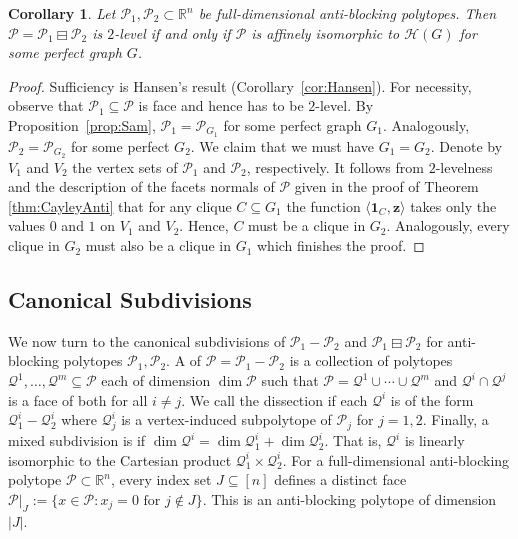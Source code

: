 \documentclass[11pt]{amsart}
\newtheorem{cor}[thm]{Corollary}
\theoremstyle{definition}
\begin{document}
\begin{cor}\label{cor:AB_2l}
    Let ${\mathcal{P}}_1,{\mathcal{P}}_2 \subset {\mathbb{R}}^n$ be full-dimensional anti-blocking
    polytopes.  Then ${\mathcal{P}} = {{{{\mathcal{P}}_1} \boxminus {{\mathcal{P}}_2}}}$ is $2$-level if and only if
    ${\mathcal{P}}$ is affinely isomorphic to ${\mathcal{H}({G})}$ for some perfect graph $G$.
\end{cor}
\begin{proof}
    Sufficiency is Hansen's result (Corollary~\ref{cor:Hansen}). For
    necessity, observe that ${\mathcal{P}}_1 \subseteq {\mathcal{P}}$ is face and hence has to be
    $2$-level. By Proposition~\ref{prop:Sam}, ${\mathcal{P}}_1 =  {\mathcal{P}}_{G_1}$ for some
    perfect graph $G_1$. Analogously, ${\mathcal{P}}_2 =  {\mathcal{P}}_{G_2}$ for some perfect $G_2$. We claim that we must have $G_1=G_2$. Denote by $V_1$ and $V_2$ the vertex sets of ${\mathcal{P}}_1$ and ${\mathcal{P}}_2$, respectively. It follows from $2$-levelness and the description of the facets normals of ${\mathcal{P}}$ given in the proof of Theorem \ref{thm:CayleyAnti} that for any clique $C\subseteq G_1$ the function $ {\langle{{{\mathbf{1}}_C,{\mathbf{z}}}}\rangle}$ takes only the values $0$ and $1$ on $V_1$ and $V_2$. Hence, $C$ must be a clique in $G_2$. Analogously, every clique in $G_2$ must also be a clique in $G_1$ which finishes the proof.
    \end{proof}

\subsection{Canonical Subdivisions}\label{ssec:AB_subdiv}
We now turn to the canonical subdivisions of ${\mathcal{P}}_1 - {\mathcal{P}}_2$ and
${{{{\mathcal{P}}_1} \boxminus {{\mathcal{P}}_2}}}$ for anti-blocking polytopes ${\mathcal{P}}_1,{\mathcal{P}}_2$.  A
{\textbf{\color{black}{subdivision}}} of ${\mathcal{P}} = {\mathcal{P}}_1 - {\mathcal{P}}_2$ is a collection of polytopes
${\mathcal{Q}}^1,\dots,{\mathcal{Q}}^m \subseteq {\mathcal{P}}$ each of dimension $\dim {\mathcal{P}}$ such that ${\mathcal{P}}
= {\mathcal{Q}}^1\cup \cdots \cup {\mathcal{Q}}^m$ and ${\mathcal{Q}}^i \cap {\mathcal{Q}}^j$ is a face of both for
all $i \neq j$. We call the dissection {\textbf{\color{black}{mixed}}} if each ${\mathcal{Q}}^i$ is of the
form ${\mathcal{Q}}^i_1 - {\mathcal{Q}}^i_2$ where ${\mathcal{Q}}^i_j$ is a vertex-induced subpolytope of
${\mathcal{P}}_j$ for $j=1,2$. Finally, a mixed subdivision is {\textbf{\color{black}{exact}}} if $\dim
{\mathcal{Q}}^i = \dim {\mathcal{Q}}^i_1 + \dim {\mathcal{Q}}^i_2$. That is, ${\mathcal{Q}}^i$ is linearly isomorphic
to the Cartesian product ${\mathcal{Q}}^i_1 \times {\mathcal{Q}}^i_2$.  For a full-dimensional
anti-blocking polytope ${\mathcal{P}} \subset {\mathbb{R}}^n$, every index set $J \subseteq [n]$
defines a distinct face ${\mathcal{P}}|_J := \{ x \in {\mathcal{P}} : x_j = 0 \text{ for } j
\not\in J \}$. This is an anti-blocking polytope of dimension $|J|$. 
\end{document}

